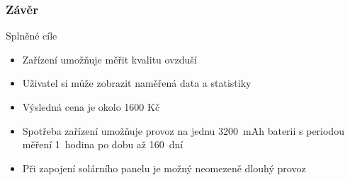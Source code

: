 \documentclass[%
  12pt,       				%
	t,                  %
	aspectratio=1610,   %
	unicode,						%
]{beamer}				    	%
\begin{document}




\begin{frame} 
	\frametitle{Závěr}
	Splněné cíle
	\begin{itemize}
		\item Zařízení umožňuje měřit kvalitu ovzduší
  		\item Uživatel si může zobrazit naměřená data a statistiky
		\item Výsledná cena je okolo 1600 Kč
		\item Spotřeba zařízení umožňuje provoz na jednu 3200~mAh baterii s periodou měření 1~hodina po dobu až 160~dní
		\item Při zapojení solárního panelu je možný neomezeně dlouhý provoz
	\end{itemize}
\end{frame}
\end{document}
